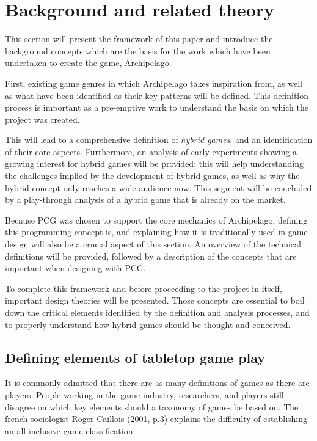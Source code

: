 \chapter{Background and related theory}
This section will present the framework of this paper and introduce the background concepts which are the basis for the work which have been undertaken to create the game, Archipelago. 

First, existing game genres in which Archipelago takes inspiration from, as well as what have been identified as their key patterns will be defined. This definition process is important as a pre-emptive work to understand the basis on which the project was created. 

This will lead to a comprehensive definition of \textit{hybrid games}, and an identification of their core aspects. Furthermore, an analysis of early experiments showing a growing interest for hybrid games will be provided; this will help understanding the challenges implied by the development of hybrid games, as well as why the hybrid concept only reaches a wide audience now. This segment will be concluded by a play-through analysis of a hybrid game that is already on the market.

Because PCG was chosen to support the core mechanics of Archipelago, defining this programming concept is, and explaining how it is traditionally used in game design will also be a crucial aspect of this section. An overview of the technical definitions will be provided, followed by a description of the concepts that are important when designing with PCG. 

To complete this framework and before proceeding to the project in itself, important design theories will be presented. Those concepts are essential to boil down the critical elements identified by the definition and analysis processes, and to properly understand how hybrid games should be thought and conceived.

\section{Defining elements of tabletop game play}
It is commonly admitted that there are as many definitions of games as there are players. People working in the game industry, researchers, and players still disagree on which key elements should a taxonomy of games be based on. The french sociologist Roger Caillois (2001, p.3)\cite{book:mpg} explains the difficulty of establishing an all-inclusive game classification:

